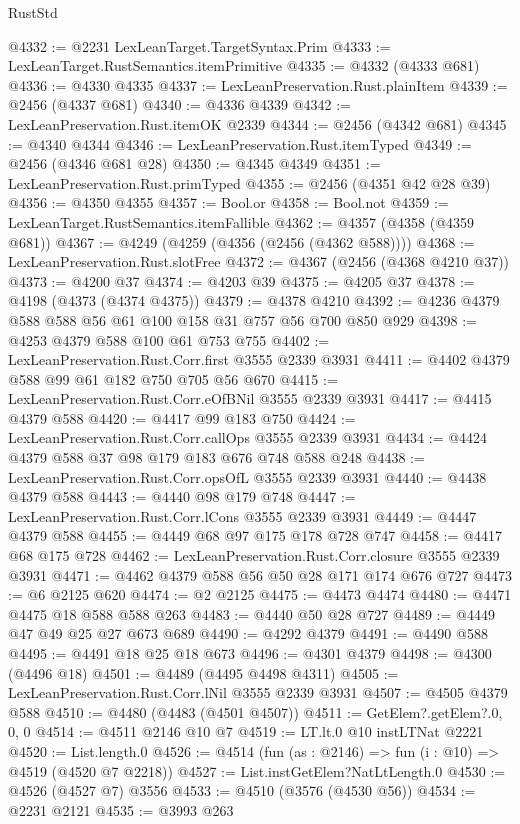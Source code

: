 \begin{lexlean}{RustStd}
\begin{coremodule}
@4332 := @2231 LexLeanTarget.TargetSyntax.Prim
@4333 := LexLeanTarget.RustSemantics.itemPrimitive
@4335 := @4332 (@4333 @681)
@4336 := @4330 @4335
@4337 := LexLeanPreservation.Rust.plainItem
@4339 := @2456 (@4337 @681)
@4340 := @4336 @4339
@4342 := LexLeanPreservation.Rust.itemOK @2339
@4344 := @2456 (@4342 @681)
@4345 := @4340 @4344
@4346 := LexLeanPreservation.Rust.itemTyped
@4349 := @2456 (@4346 @681 @28)
@4350 := @4345 @4349
@4351 := LexLeanPreservation.Rust.primTyped
@4355 := @2456 (@4351 @42 @28 @39)
@4356 := @4350 @4355
@4357 := Bool.or
@4358 := Bool.not
@4359 := LexLeanTarget.RustSemantics.itemFallible
@4362 := @4357 (@4358 (@4359 @681))
@4367 := @4249 (@4259 (@4356 (@2456 (@4362 @588))))
@4368 := LexLeanPreservation.Rust.slotFree
@4372 := @4367 (@2456 (@4368 @4210 @37))
@4373 := @4200 @37
@4374 := @4203 @39
@4375 := @4205 @37
@4378 := @4198 (@4373 (@4374 @4375))
@4379 := @4378 @4210
@4392 := @4236 @4379 @588 @588 @56 @61 @100 @158 @31 @757 @56 @700 @850 @929
@4398 := @4253 @4379 @588 @100 @61 @753 @755
@4402 := LexLeanPreservation.Rust.Corr.first @3555 @2339 @3931
@4411 := @4402 @4379 @588 @99 @61 @182 @750 @705 @56 @670
@4415 := LexLeanPreservation.Rust.Corr.eOfBNil @3555 @2339 @3931
@4417 := @4415 @4379 @588
@4420 := @4417 @99 @183 @750
@4424 := LexLeanPreservation.Rust.Corr.callOps @3555 @2339 @3931
@4434 := @4424 @4379 @588 @37 @98 @179 @183 @676 @748 @588 @248
@4438 := LexLeanPreservation.Rust.Corr.opsOfL @3555 @2339 @3931
@4440 := @4438 @4379 @588
@4443 := @4440 @98 @179 @748
@4447 := LexLeanPreservation.Rust.Corr.lCons @3555 @2339 @3931
@4449 := @4447 @4379 @588
@4455 := @4449 @68 @97 @175 @178 @728 @747
@4458 := @4417 @68 @175 @728
@4462 := LexLeanPreservation.Rust.Corr.closure @3555 @2339 @3931
@4471 := @4462 @4379 @588 @56 @50 @28 @171 @174 @676 @727
@4473 := @6 @2125 @620
@4474 := @2 @2125
@4475 := @4473 @4474
@4480 := @4471 @4475 @18 @588 @588 @263
@4483 := @4440 @50 @28 @727
@4489 := @4449 @47 @49 @25 @27 @673 @689
@4490 := @4292 @4379
@4491 := @4490 @588
@4495 := @4491 @18 @25 @18 @673
@4496 := @4301 @4379
@4498 := @4300 (@4496 @18)
@4501 := @4489 (@4495 @4498 @4311)
@4505 := LexLeanPreservation.Rust.Corr.lNil @3555 @2339 @3931
@4507 := @4505 @4379 @588
@4510 := @4480 (@4483 (@4501 @4507))
@4511 := GetElem?.getElem?.{0, 0, 0}
@4514 := @4511 @2146 @10 @7
@4519 := LT.lt.{0} @10 instLTNat @2221
@4520 := List.length.{0}
@4526 := @4514 (fun (as : @2146) => fun (i : @10) => @4519 (@4520 @7 @2218))
@4527 := List.instGetElem?NatLtLength.{0}
@4530 := @4526 (@4527 @7) @3556
@4533 := @4510 (@3576 (@4530 @56))
@4534 := @2231 @2121
@4535 := @3993 @263

\end{coremodule}
\end{lexlean}
